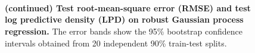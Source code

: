 \begin{figure}[ht]
  \vspace{0.05in}\\ 
  \vspace{0.05in}\\
   \vspace{0.05in}\\
  \caption{\textbf{(continued) Test root-mean-square error (RMSE) and test log predictive density (LPD) on robust Gaussian process regression.}
  The error bands show the 95\% bootstrap confidence intervals obtained from 20 independent 90\% train-test splits.
  }
\end{figure}

